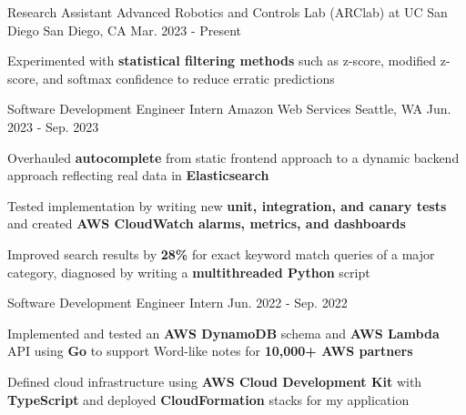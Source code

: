 

\begin{cventries}
  \cventry
    {Research Assistant}
    {Advanced Robotics and Controls Lab (ARClab) at UC San Diego}
    {San Diego, CA}
    {Mar. 2023 - Present}
    {
      \begin{cvitems}
        \item {Experimented with \textbf{statistical filtering methods} such as z-score, modified z-score, and softmax confidence to reduce erratic predictions} 
      \end{cvitems}
    }
    
  \cvtwoentry
    {Software Development Engineer Intern} %
    {Amazon Web Services} %
    {Seattle, WA} %
    {Jun. 2023 - Sep. 2023}
    {
      \begin{cvitems}
        \item {Overhauled \textbf{autocomplete} from static frontend approach to a dynamic backend approach reflecting real data in \textbf{Elasticsearch}}
        \item {Tested implementation by writing new \textbf{unit, integration, and canary tests} and created \textbf{AWS CloudWatch alarms, metrics, and dashboards}}
        \item {Improved search results by \textbf{28\%} for exact keyword match queries of a major category, diagnosed by writing a \textbf{multithreaded Python} script}
      \end{cvitems}
    }
    {Software Development Engineer Intern}
    {Jun. 2022 - Sep. 2022} %
    {
      \begin{cvitems} %
        \item {Implemented and tested an \textbf{AWS DynamoDB} schema and \textbf{AWS Lambda} API using \textbf{Go} to support Word-like notes for \textbf{10,000+ AWS partners} }
        \item {Defined cloud infrastructure using \textbf{AWS Cloud Development Kit} with \textbf{TypeScript} and deployed \textbf{CloudFormation} stacks for my application}
      \end{cvitems}
    }


\end{cventries}
